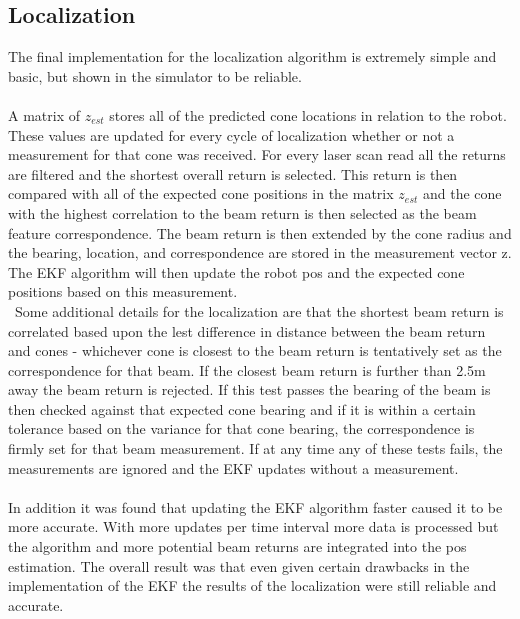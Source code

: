 \documentclass[letterpaper,12pt]{article}
\begin{document}
\subsection*{Localization} 
The final implementation for the localization algorithm is extremely simple and basic, but shown in the simulator to be reliable.
\\\\
A matrix of $z_{est}$ stores all of the predicted cone locations in relation to the robot. These values are updated for every cycle of localization whether or not a measurement for that cone was received. For every laser scan read all the returns are filtered and the shortest overall return is selected. This return is then compared with all of the expected cone positions in the matrix $z_{est}$ and the cone with the highest correlation to the beam return is then selected as the beam feature correspondence. The beam return is then extended by the cone radius and the bearing, location, and correspondence are stored in the measurement vector z. The EKF algorithm will then update the robot pos and the expected cone positions based on this measurement. 
\\\
Some additional details for the localization are that the shortest beam return is correlated based upon the lest difference in distance between the beam return and cones - whichever cone is closest to the beam return is tentatively set as the correspondence for that beam. If the closest beam return is further than 2.5m away the beam return is rejected. If this test passes the bearing of the beam is then checked against that expected cone bearing and if it is within a certain tolerance based on the variance for that cone bearing, the correspondence is firmly set for that beam measurement. If at any time any of these tests fails, the measurements are ignored and the EKF updates without a measurement. 
\\\\ 
In addition it was found that updating the EKF algorithm faster caused it to be more accurate. With more updates per time interval more data is processed but the algorithm and more potential beam returns are integrated into the pos estimation. The overall result was that even given certain drawbacks in the implementation of the EKF the results of the localization were still reliable and accurate. 
\end{document}
